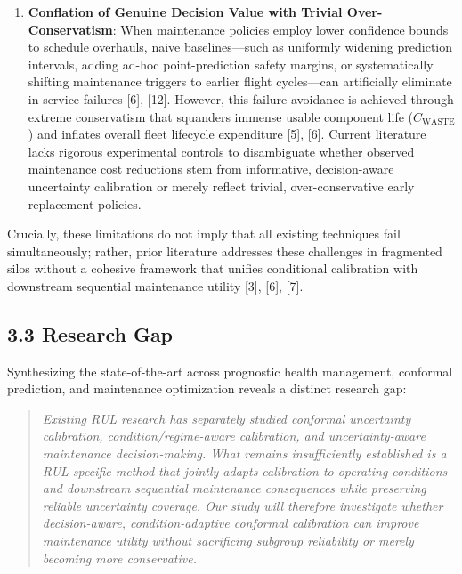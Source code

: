 \documentclass[12pt,a4paper]{article}
\begin{document}
\begin{enumerate}
    \item \textbf{Conflation of Genuine Decision Value with Trivial Over-Conservatism}: When maintenance policies employ lower confidence bounds to schedule overhauls, naive baselines—such as uniformly widening prediction intervals, adding ad-hoc point-prediction safety margins, or systematically shifting maintenance triggers to earlier flight cycles—can artificially eliminate in-service failures [6], [12]. However, this failure avoidance is achieved through extreme conservatism that squanders immense usable component life ($C_{\text{WASTE}}$) and inflates overall fleet lifecycle expenditure [5], [6]. Current literature lacks rigorous experimental controls to disambiguate whether observed maintenance cost reductions stem from informative, decision-aware uncertainty calibration or merely reflect trivial, over-conservative early replacement policies.
\end{enumerate}
Crucially, these limitations do not imply that all existing techniques fail simultaneously; rather, prior literature addresses these challenges in fragmented silos without a cohesive framework that unifies conditional calibration with downstream sequential maintenance utility [3], [6], [7].

\subsection*{3.3 Research Gap}
Synthesizing the state-of-the-art across prognostic health management, conformal prediction, and maintenance optimization reveals a distinct research gap:

\begin{quote}
\textit{Existing RUL research has separately studied conformal uncertainty calibration, condition/regime-aware calibration, and uncertainty-aware maintenance decision-making. What remains insufficiently established is a RUL-specific method that jointly adapts calibration to operating conditions and downstream sequential maintenance consequences while preserving reliable uncertainty coverage. Our study will therefore investigate whether decision-aware, condition-adaptive conformal calibration can improve maintenance utility without sacrificing subgroup reliability or merely becoming more conservative.}
\end{quote}
\end{document}
